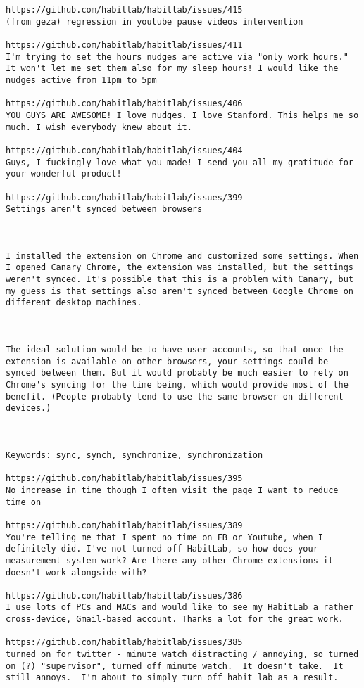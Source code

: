 \begin{lstlisting}[breaklines]
https://github.com/habitlab/habitlab/issues/415
(from geza) regression in youtube pause videos intervention

https://github.com/habitlab/habitlab/issues/411
I'm trying to set the hours nudges are active via "only work hours." It won't let me set them also for my sleep hours! I would like the nudges active from 11pm to 5pm

https://github.com/habitlab/habitlab/issues/406
YOU GUYS ARE AWESOME! I love nudges. I love Stanford. This helps me so much. I wish everybody knew about it.

https://github.com/habitlab/habitlab/issues/404
Guys, I fuckingly love what you made! I send you all my gratitude for your wonderful product!

https://github.com/habitlab/habitlab/issues/399
Settings aren't synced between browsers



I installed the extension on Chrome and customized some settings. When I opened Canary Chrome, the extension was installed, but the settings weren't synced. It's possible that this is a problem with Canary, but my guess is that settings also aren't synced between Google Chrome on different desktop machines.



The ideal solution would be to have user accounts, so that once the extension is available on other browsers, your settings could be synced between them. But it would probably be much easier to rely on Chrome's syncing for the time being, which would provide most of the benefit. (People probably tend to use the same browser on different devices.)



Keywords: sync, synch, synchronize, synchronization

https://github.com/habitlab/habitlab/issues/395
No increase in time though I often visit the page I want to reduce time on

https://github.com/habitlab/habitlab/issues/389
You're telling me that I spent no time on FB or Youtube, when I definitely did. I've not turned off HabitLab, so how does your measurement system work? Are there any other Chrome extensions it doesn't work alongside with?

https://github.com/habitlab/habitlab/issues/386
I use lots of PCs and MACs and would like to see my HabitLab a rather cross-device, Gmail-based account. Thanks a lot for the great work.

https://github.com/habitlab/habitlab/issues/385
turned on for twitter - minute watch distracting / annoying, so turned on (?) "supervisor", turned off minute watch.  It doesn't take.  It still annoys.  I'm about to simply turn off habit lab as a result.


\end{lstlisting}
